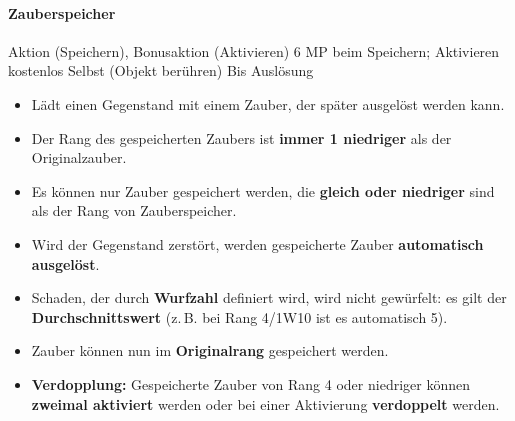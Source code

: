\paragraph*{Zauberspeicher}
\spellcard
{}
{Aktion (Speichern), Bonusaktion (Aktivieren)}
{6 MP beim Speichern; Aktivieren kostenlos}
{Selbst (Objekt berühren)}
{Bis Auslösung}
{
	\begin{itemize}
		\item Lädt einen Gegenstand mit einem Zauber, der später ausgelöst werden kann.
		\item Der Rang des gespeicherten Zaubers ist \textbf{immer 1 niedriger} als der Originalzauber.
		\item Es können nur Zauber gespeichert werden, die \textbf{gleich oder niedriger} sind als der Rang von Zauberspeicher.
		\item Wird der Gegenstand zerstört, werden gespeicherte Zauber \textbf{automatisch ausgelöst}.
		\item Schaden, der durch \textbf{Wurfzahl} definiert wird, wird nicht gewürfelt:
		es gilt der \textbf{Durchschnittswert} (z.\,B. bei Rang 4/1W10 ist es automatisch 5).
	\end{itemize}
}
{
	\begin{itemize}
		\item Zauber können nun im \textbf{Originalrang} gespeichert werden.
		\item \textbf{Verdopplung:} Gespeicherte Zauber von Rang 4 oder niedriger können
		\textbf{zweimal aktiviert} werden oder bei einer Aktivierung \textbf{verdoppelt} werden.
	\end{itemize}
}

